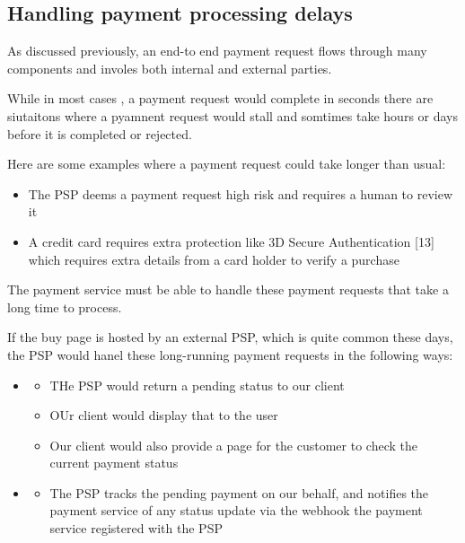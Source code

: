 \documentclass{report}
\theoremstyle{definition}
\let\oldsubsection\subsection
\renewcommand{\subsection}{\oldsubsection*}
\begin{document}
\subsection{Handling payment processing delays}

As discussed previously, an end-to end payment request flows through many components and involes both internal and external parties.

While in most cases , a payment request would complete in seconds there are siutaitons where a pyamnent request would stall and somtimes take hours or days before it is completed or rejected.

Here are some examples where a payment request could take longer than usual:

\begin{itemize}
\item
The PSP deems a payment request high risk and requires a human to review it
\item
A credit card requires extra protection like 3D Secure Authentication [13] which requires extra details from a card holder to verify a purchase
\end{itemize}

The payment service must be able to handle these payment requests that take a long time to process.

If the buy page is hosted by an external PSP, which is quite common these days, the PSP would hanel these long-running payment requests in the following ways:

\begin{itemize}
\item

\begin{itemize}
\item
THe PSP would return a pending status to our client
\item
OUr client would display that to the user
\item
Our client would also provide a page for the customer to check the current payment status
\end{itemize}

\item

\begin{itemize}
\item
The PSP tracks the pending payment on our behalf, and notifies the payment service of any status update via the webhook the payment service registered with the PSP
\end{itemize}
\end{itemize}
\end{document}

